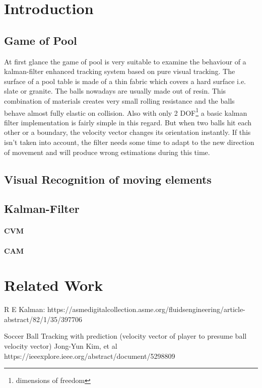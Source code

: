 \documentclass[notitlepage, a4paper, 11pt]{scrartcl}
\begin{document}
\begin{multicols}{2}
\section{Introduction}

\subsection{Game of Pool}

At first glance the game of pool is very suitable to examine the behaviour of a kalman-filter \cite{kalman} enhanced tracking system based on pure visual tracking. 
The surface of a pool table is made of a thin fabric which covers a hard surface i.e. slate or granite.
The balls nowadays are usually made out of resin. This combination of materials creates very small rolling resistance and the balls behave almost fully elastic on collision.
Also with only 2 DOF\footnote{dimensions of freedom} a basic kalman filter implementation is fairly simple in this regard. But when two balls hit each other or a boundary, the velocity vector
changes its orientation instantly. If this isn't taken into account, the filter needs some time to adapt to the new direction of movement and will produce wrong estimations during this time.


\subsection{Visual Recognition of moving elements}

\subsection{Kalman-Filter}
\paragraph{CVM}
\paragraph{CAM}


\section{Related Work}

R E Kalman: https://asmedigitalcollection.asme.org/fluidsengineering/article-abstract/82/1/35/397706

Soccer Ball Tracking with prediction (velocity vector of player to presume ball velocity vector)
Jong-Yun Kim, et al https://ieeexplore.ieee.org/abstract/document/5298809


\end{multicols}
\end{document}

